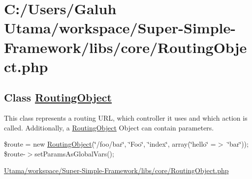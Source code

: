 \hypertarget{_c_1_2_users_2_galuh_01_utama_2workspace_2_super-_simple-_framework_2libs_2core_2_routing_object_8php-example}{\section{\-C\-:/\-Users/\-Galuh Utama/workspace/\-Super-\/\-Simple-\/\-Framework/libs/core/\-Routing\-Object.\-php}
}
\subsection*{\-Class \hyperlink{class_routing_object}{\-Routing\-Object}}

\-This class represents a routing \-U\-R\-L, which controller it uses and which action is called. \-Additionally, a \hyperlink{class_routing_object}{\-Routing\-Object} \-Object can contain parameters. 

\$route = new \hyperlink{class_routing_object}{\-Routing\-Object}(\char`\"{}/foo/bar\char`\"{}, \char`\"{}\-Foo\char`\"{}, \char`\"{}index\char`\"{}, array(\char`\"{}hello\char`\"{} =$>$ \char`\"{}bar\char`\"{})); \$route-\/$>$set\-Params\-As\-Global\-Vars();


\begin{DoxyCodeInclude}
\end{DoxyCodeInclude}
 \hyperlink{_routing_object_8php_source}{\-Utama/workspace/\-Super-\/\-Simple-\/\-Framework/libs/core/\-Routing\-Object.\-php} 